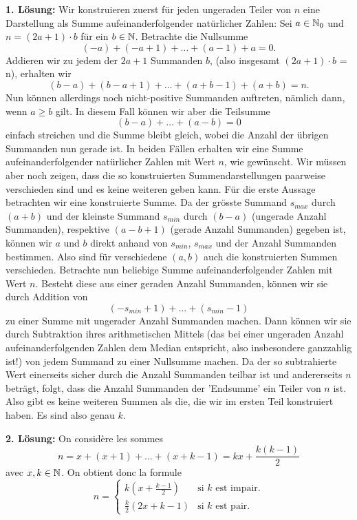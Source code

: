 \documentclass[language=german,style=solution]{smo}
\begin{document}
\begin{enumerate}[label=\textbf{\arabic*.}]
\textbf{1. Lösung:}
Wir konstruieren zuerst für jeden ungeraden Teiler von $n$ eine Darstellung als Summe aufeinanderfolgender natürlicher Zahlen: \newline
Sei $a \in \mathbb{N}_0$ und $n = (2a+1) \cdot b$ für ein $b \in \mathbb{N}$. Betrachte die Nullsumme 
\[
(-a) + (-a+1) + \dots + (a-1) + a = 0.
\]
Addieren wir zu jedem der $2a+1$ Summanden $b$, (also insgesamt $(2a+1) \cdot b$ = n), erhalten wir
\[
(b-a) + (b-a+1) + \dots + (a+b-1) + (a+b) = n.
\]
Nun können allerdings noch nicht-positive Summanden auftreten, nämlich dann, wenn $a \geq b$ gilt. In diesem Fall können wir aber die Teilsumme
\[
(b-a) + \dots + (a-b) = 0
\]
einfach streichen und die Summe bleibt gleich, wobei die Anzahl der übrigen Summanden nun gerade ist. In beiden Fällen erhalten wir eine Summe aufeinanderfolgender natürlicher Zahlen mit Wert $n$, wie gewünscht. Wir müssen aber noch zeigen, dass die so konstruierten Summendarstellungen paarweise verschieden sind und es keine weiteren geben kann.
\newline
Für die erste Aussage betrachten wir eine konstruierte Summe. Da der grösste Summand $s_{max}$ durch $(a+b)$ und der kleinste Summand $s_{min}$ durch $(b-a)$ (ungerade Anzahl Summanden), respektive $(a-b+1)$ (gerade Anzahl Summanden) gegeben ist, können wir $a$ und $b$ direkt anhand von $s_{min}$, $s_{max}$ und der Anzahl Summanden bestimmen. Also sind für verschiedene $(a,b)$ auch die konstruierten Summen verschieden.
\newline
Betrachte nun beliebige Summe aufeinanderfolgender Zahlen mit Wert $n$. Besteht diese aus einer geraden Anzahl Summanden, können wir sie durch Addition von
\[
(-s_{min}+1) + \dots + (s_{min}-1)
\]
zu einer Summe mit ungerader Anzahl Summanden machen. Dann können wir sie durch Subtraktion ihres arithmetischen Mittels (das bei einer ungeraden Anzahl aufeinanderfolgenden Zahlen dem Median entspricht, also insbesondere ganzzahlig ist!) von jedem Summand zu einer Nullsumme machen. Da der so subtrahierte Wert einerseits sicher durch die Anzahl Summanden teilbar ist und andererseits $n$ beträgt, folgt, dass die Anzahl Summanden der 'Endsumme' ein Teiler von $n$ ist. Also gibt es keine weiteren Summen als die, die wir im ersten Teil konstruiert haben. Es sind also genau $k$.

\textbf{2. Lösung:} On considère les sommes 
\[
	n = x + (x+1) + \ldots + (x + k-1) = kx + \frac{k(k-1)}{2}
\]
avec $x, k\in \mathbb{N}$. On obtient donc la formule
\[
	n = \left\{\begin{array}{ll}
	k(x+\frac{k-1}{2}) & \mbox{si } k \mbox{ est impair.}\\
	\frac{k}{2}(2x+k-1) & \mbox{si } k \mbox{ est pair.}
	\end{array}\right.
\]


\end{enumerate}
\end{document}
